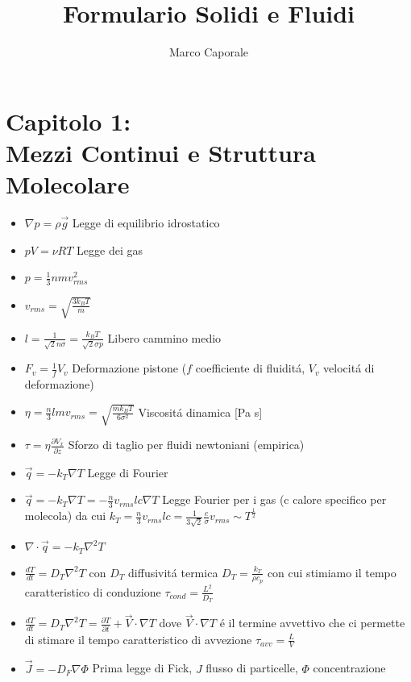 \documentclass[a4paper]{article}
\begin{document}
	\title{Formulario Solidi e Fluidi}
	\author{Marco Caporale}
	\maketitle

\section{Capitolo 1:\\ Mezzi Continui e Struttura Molecolare}
\begin{itemize}
	\item $\nabla p = \rho \overrightarrow{g}$ Legge di equilibrio idrostatico
	\item $pV = \nu RT$ Legge dei gas
	\item $p = \frac{1}{3} nm v_{rms}^2$
	\item $v_{rms} = \sqrt{\frac{3k_B T}{m}}$
	\item $\textit{l} = \frac{1}{\sqrt{2} n \sigma} = \frac{k_B T}{\sqrt{2} \sigma p}$ Libero cammino medio
	\item $F_v = \frac{1}{f} V_v$ Deformazione pistone ($f$ coefficiente di fluidit\'a, $V_v$ velocit\'a di deformazione)
	\item $\eta = \frac{n}{3}lmv_{rms} = \sqrt{\frac{mk_BT}{6 \sigma^2}}$  Viscosit\'a dinamica [Pa s]
	\item $\tau = \eta \frac{\partial V_x}{\partial z}$ Sforzo di taglio per fluidi newtoniani (empirica)
	\item $\overrightarrow{q} = -k_T \nabla T$ Legge di Fourier
	\item $\overrightarrow{q} = -k_T \nabla T = -\frac{n}{3} v_{rms} l c \nabla T$ Legge Fourier per i gas (c calore specifico per molecola) da cui $k_T = \frac{n}{3} v_{rms}lc =\frac{1}{3 \sqrt{2}} \frac{c}{\sigma} v_{rms} \sim T^{\frac{1}{2}}$
	\item $\nabla \cdot \overrightarrow{q} = -k_T \nabla^2 T$
	\item $\frac{dT}{dt}=D_T \nabla^2 T$ con $D_T$ diffusivit\'a termica $D_T = \frac{k_T}{\rho c_p}$ con cui stimiamo il tempo caratteristico di conduzione $\tau_{cond} = \frac{L^2}{D_T}$
	\item $\frac{dT}{dt}=D_T \nabla^2 T = \frac{\partial T}{\partial t} + \overrightarrow{V} \cdot \nabla T$ dove $\overrightarrow{V} \cdot \nabla T$ \'e il termine avvettivo che ci permette di stimare il tempo caratteristico di avvezione $\tau_{avv} = \frac{L}{V}$
	\item $\overrightarrow{J} = -D_F \nabla \Phi$ Prima legge di Fick, $J$ flusso di particelle, $\Phi$ concentrazione

\end{itemize}
\end{document}
